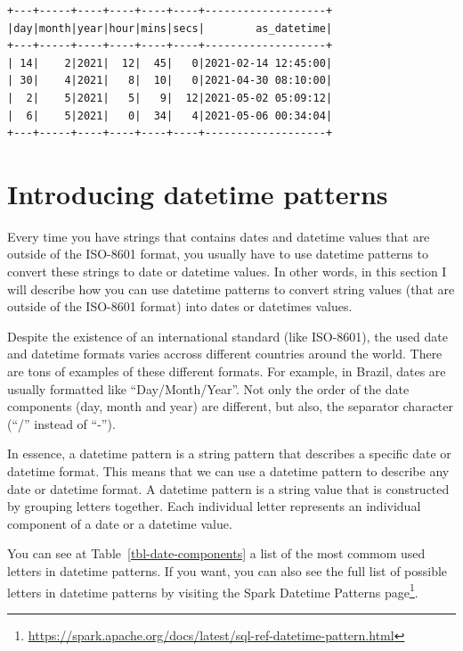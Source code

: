 \documentclass[
  11pt,
  letterpaper,
  DIV=11,
  numbers=noendperiod]{scrreprt}
\begin{document}
\begin{verbatim}
+---+-----+----+----+----+----+-------------------+
|day|month|year|hour|mins|secs|        as_datetime|
+---+-----+----+----+----+----+-------------------+
| 14|    2|2021|  12|  45|   0|2021-02-14 12:45:00|
| 30|    4|2021|   8|  10|   0|2021-04-30 08:10:00|
|  2|    5|2021|   5|   9|  12|2021-05-02 05:09:12|
|  6|    5|2021|   0|  34|   4|2021-05-06 00:34:04|
+---+-----+----+----+----+----+-------------------+
\end{verbatim}

\section{Introducing datetime patterns}\label{sec-datetime-patterns}

Every time you have strings that contains dates and datetime values that
are outside of the ISO-8601 format, you usually have to use datetime
patterns to convert these strings to date or datetime values. In other
words, in this section I will describe how you can use datetime patterns
to convert string values (that are outside of the ISO-8601 format) into
dates or datetimes values.

Despite the existence of an international standard (like ISO-8601), the
used date and datetime formats varies accross different countries around
the world. There are tons of examples of these different formats. For
example, in Brazil, dates are usually formatted like ``Day/Month/Year''.
Not only the order of the date components (day, month and year) are
different, but also, the separator character (``/'' instead of ``-'').

In essence, a datetime pattern is a string pattern that describes a
specific date or datetime format. This means that we can use a datetime
pattern to describe any date or datetime format. A datetime pattern is a
string value that is constructed by grouping letters together. Each
individual letter represents an individual component of a date or a
datetime value.

You can see at Table~\ref{tbl-date-components} a list of the most commom
used letters in datetime patterns. If you want, you can also see the
full list of possible letters in datetime patterns by visiting the Spark
Datetime Patterns page\footnote{\url{https://spark.apache.org/docs/latest/sql-ref-datetime-pattern.html}}.
\end{document}
